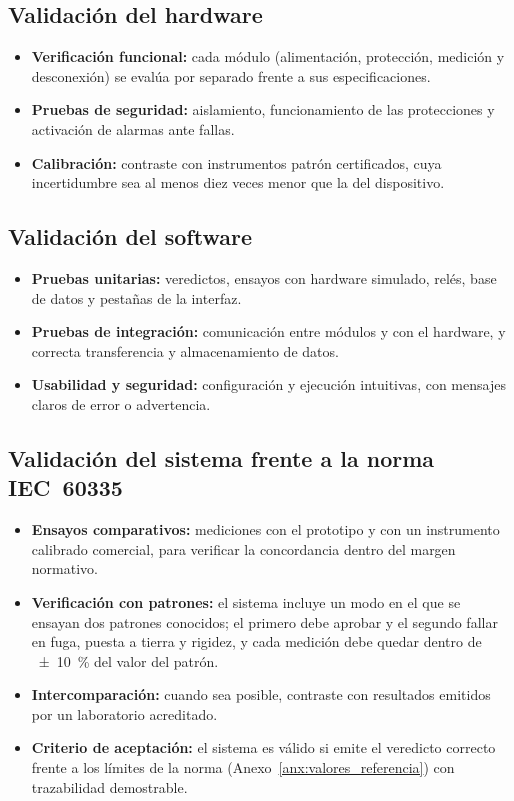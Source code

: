 \subsection{Validación del hardware}
\begin{itemize}
    \item \textbf{Verificación funcional:} cada módulo (alimentación, protección,
          medición y desconexión) se evalúa por separado frente a sus
          especificaciones.
    \item \textbf{Pruebas de seguridad:} aislamiento, funcionamiento de las
          protecciones y activación de alarmas ante fallas.
    \item \textbf{Calibración:} contraste con instrumentos patrón certificados,
          cuya incertidumbre sea al menos diez veces menor que la del
          dispositivo.
\end{itemize}

\subsection{Validación del software}
\begin{itemize}
    \item \textbf{Pruebas unitarias:} veredictos, ensayos con hardware simulado,
          relés, base de datos y pestañas de la interfaz.
    \item \textbf{Pruebas de integración:} comunicación entre módulos y con el
          hardware, y correcta transferencia y almacenamiento de datos.
    \item \textbf{Usabilidad y seguridad:} configuración y ejecución intuitivas,
          con mensajes claros de error o advertencia.
\end{itemize}

\subsection{Validación del sistema frente a la norma IEC~60335}
\begin{itemize}
    \item \textbf{Ensayos comparativos:} mediciones con el prototipo y con un
          instrumento calibrado comercial, para verificar la concordancia dentro
          del margen normativo.
    \item \textbf{Verificación con patrones:} el sistema incluye un modo en el que
          se ensayan dos patrones conocidos; el primero debe aprobar y el segundo
          fallar en fuga, puesta a tierra y rigidez, y cada medición debe quedar
          dentro de \SI{\pm 10}{\percent} del valor del patrón.
    \item \textbf{Intercomparación:} cuando sea posible, contraste con resultados
          emitidos por un laboratorio acreditado.
    \item \textbf{Criterio de aceptación:} el sistema es válido si emite el
          veredicto correcto frente a los límites de la norma
          (Anexo~\ref{anx:valores_referencia}) con trazabilidad demostrable.
\end{itemize}
